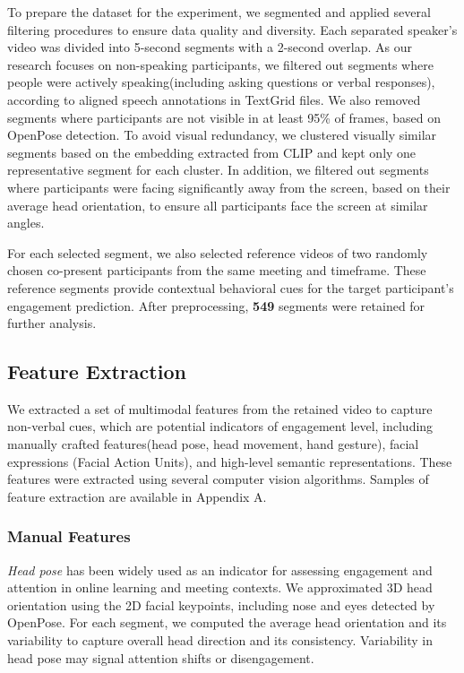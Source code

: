 \documentclass[
]{ceurart}
\begin{document}
To prepare the dataset for the experiment, we segmented and applied several filtering procedures to ensure data quality and diversity. Each separated speaker's video was divided into 5-second segments with a 2-second overlap. As our research focuses on non-speaking participants, we filtered out segments where people were actively speaking(including asking questions or verbal responses), according to aligned speech annotations in TextGrid files. We also removed segments where participants are not visible in at least 95\% of frames, based on OpenPose detection. To avoid visual redundancy, we clustered visually similar segments based on the embedding extracted from CLIP\cite{radford2021learning} and kept only one representative segment for each cluster. In addition, we filtered out segments where participants were facing significantly away from the screen, based on their average head orientation, to ensure all participants face the screen at similar angles. 

For each selected segment, we also selected reference videos of two randomly chosen co-present participants
from the same meeting and timeframe. These reference segments provide contextual behavioral cues for the target participant's engagement prediction. After preprocessing, \textbf{549} segments were retained for further analysis.


\subsection{Feature Extraction}
We extracted a set of multimodal features from the retained video to capture non-verbal cues, which are potential indicators of engagement level, including manually crafted features(head pose, head movement, hand gesture), facial expressions (Facial Action Units),  and high-level semantic representations. These features were extracted using several computer vision algorithms. Samples of feature extraction are available in Appendix A.

\subsubsection{Manual Features}
\textit{Head pose} has been widely used as an indicator for assessing engagement and attention in online learning and meeting contexts\cite{gupta2016daisee}\cite{dewan2019engagement}. We approximated 3D head orientation using the 2D facial keypoints, including nose and eyes detected by OpenPose. For each segment, we computed the average head orientation and its variability to capture overall head direction and its consistency. Variability in head pose may signal attention shifts or disengagement.
\end{document}

